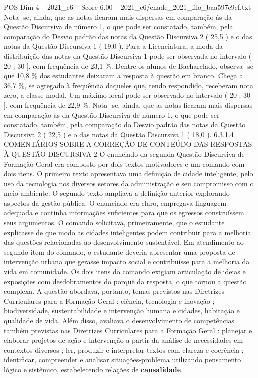 \begin{textsample}{POS Dim 4 – 2021\_c6 – Score 6.00 – 2021\_c6/enade\_2021\_filo\_baa597e9cf.txt}
Nota -se, ainda, que as notas ficaram mais dispersas em comparação às da Questão Discursiva de número 1, o que pode ser constatado, também, pela comparação do Desvio padrão das notas da Questão Discursiva 2 ( 25,5 ) e o das notas da Questão Discursiva 1 ( 19,0 ).
Para a Licenciatura, a moda da distribuição das notas da Questão Discursiva 1 pode ser observada no intervalo ( 20 ; 30 ], com frequência de 23,1 \%.
Dentre os alunos de Bacharelado, observa -se que 10,8 \% dos estudantes deixaram a resposta à questão em branco.
Chega a 36,7 \%, se agregado à frequência daqueles que, tendo respondido, receberam nota zero, a classe modal.
Um máximo local pode ser observado no intervalo ( 20 ; 30 ], com frequência de 22,9 \%.
Nota -se, ainda, que as notas ficaram mais dispersas em comparação às da Questão Discursiva de número 1, o que pode ser constatado, também, pela comparação do Desvio padrão das notas da Questão Discursiva 2 ( 22,5 ) e o das notas da Questão Discursiva 1 ( 18,0 ). 6.3.1.4 COMENTÁRIOS SOBRE A CORREÇÃO DE CONTEÚDO DAS RESPOSTAS À QUESTÃO DISCURSIVA 2 O enunciado da segunda Questão Discursiva de Formação Geral era composto por dois textos motivadores e um comando com dois itens.
O primeiro texto apresentava uma definição de cidade inteligente, pelo uso da tecnologia nos diversos setores da administração e seu compromisso com o meio ambiente.
O segundo texto ampliava a definição anterior explorando aspectos da gestão pública.
O enunciado era claro, empregava linguagem adequada e continha informações suficientes para que os egressos construíssem seus argumentos.
O comando solicitava, primeiramente, que o estudante explicasse de que modo as cidades inteligentes podem contribuir para a melhoria das questões relacionadas ao desenvolvimento sustentável.
Em atendimento ao segundo item do comando, o estudante deveria apresentar uma proposta de intervenção urbana que gerasse impacto social e contribuísse para a melhoria da vida em comunidade.
Os dois itens do comando exigiam articulação de ideias e exposições com desdobramentos do porquê da resposta, o que tornou a questão complexa.
A questão abordava, portanto, temas previstos nas Diretrizes Curriculares para a Formação Geral : ciência, tecnologia e inovação ; biodiversidade, sustentabilidade e intervenção humana e cidades, habitação e qualidade de vida.
Além disso, avaliava o desenvolvimento de competências também previstas nas Diretrizes Curriculares para a Formação Geral : planejar e elaborar projetos de ação e intervenção a partir da análise de necessidades em contextos diversos ; ler, produzir e interpretar textos com clareza e coerência ; identificar, compreender e analisar situações-problema utilizando pensamento lógico e sistêmico, estabelecendo relações de \textbf{causalidade}.

\end{textsample}
